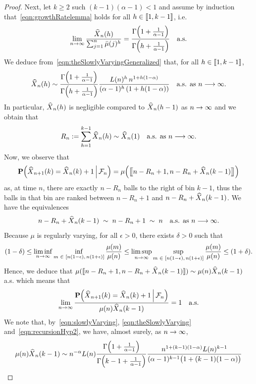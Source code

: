 \documentclass[AHL,Unicode,longabstracts,published]{cedram}
\renewcommand{\P}{\mathbf{P}}
\newcommand{\clF}{\mathcal{F}}
\let\originalleft\left
\let\originalright\right
\renewcommand{\left}{\mathopen{}\mathclose\bgroup\originalleft}
\renewcommand{\right}{\aftergroup\egroup\originalright}
\let\oldin\in
\renewcommand{\in}{\mathchoice{\oldin}{\oldin}{\,\oldin\,}{\,\oldin\,}}
\renewcommand*{\to}{\mathchoice{\longrightarrow}{\rightarrow}{\rightarrow}{\rightarrow}}
\let\oldhat\hat
\renewcommand*{\hat}[1]{\mathchoice{\widehat{#1}}{\widehat{#1}}{\oldhat{#1}}{\oldhat{#1}}}
\newcommand{\llbracket}{\mathopen{[\mkern -2.7mu[}}
\newcommand{\rrbracket}{\mathclose{]\mkern -2.7mu]}}
\newcommand{\llb}{\llbracket}
\newcommand{\rrb}{\rrbracket}
\newcommand{\llbigbracket}{\mathopen{\bigl[\mkern -4.2mu\bigl[}}
\newcommand{\rrbigbracket}{\mathclose{\bigr]\mkern -4.2mu\bigr]}}
\newcommand{\llbg}{\llbigbracket}
\newcommand{\rrbg}{\rrbigbracket}
\begin{document}
\begin{proof}
Next, let $k \geq 2$ such $(k-1)(\alpha-1) < 1$ and assume by induction that~\eqref{eqn:growthRatelemma} holds for all $h \in \llb 1, k-1\rrb $, i.e.
\begin{equation}\label{eqn:recursionHyp}
\lim_{n \to \infty} \frac{\hat{X}_n(h)}{\sum_{j=1}^n \bar{\mu}(j)^{h}} = \frac{\Gamma\left(1 + \frac{1}{\alpha - 1}\right)}{\Gamma\left(h + \frac{1}{\alpha - 1}\right)} \quad \text{a.s.}
\end{equation}
We deduce from~\eqref{eqn:theSlowlyVaryingGeneralized} that, for all $h \in \llb 1, k-1\rrb$,
\begin{equation}\label{eqn:recursionHyp2}
\hat{X}_n(h) \sim \frac{\Gamma\left(1 + \frac{1}{\alpha - 1}\right)}{\Gamma\left(h + \frac{1}{\alpha - 1}\right)} \frac{L(n)^h\, n^{1 + h(1-\alpha)}}{(\alpha-1)^h\,(1 + h(1-\alpha))} \quad \text{a.s. as $n \to \infty$}.
\end{equation}
In particular, $\hat{X}_n(h)$ is negligible compared to $\hat{X}_n(h-1)$ as $n\to\infty$ and we obtain that
\[
R_n
:= \sum_{h=1}^{k-1} \hat{X}_n(h) \sim \hat{X}_n(1) \quad \text{a.s. as $n \to \infty$}.
\]
Now, we observe that
\[
\P\left(\hat{X}_{n+1}(k) = \hat{X}_n(k) + 1\,\middle|\, \clF_n\right) = \mu\left(\llbg n - R_n+1, n - R_n + \hat{X}_n(k-1)\rrbg\right)
\]
as, at time $n$, there are exactly $n-R_n$ balls to the right of bin $k-1$, thus the balls in that bin are ranked between $n - R_n+1$ and $n - R_n + \hat{X}_n(k-1)$. We have the equivalences
\[
n - R_n + \hat{X}_{n}(k-1) \; \sim \; n - R_n + 1\; \sim \; n \quad \text{a.s. as $n \to \infty$}.
\]
Because $\mu$ is regularly varying, for all $\epsilon > 0$, there exists $\delta > 0$ such that
\[
(1 - \delta) \leq \liminf_{n \to \infty} \inf_{m \in [n(1-\epsilon),\,n(1+\epsilon)]} \frac{\mu(m)}{\mu(n)} \leq \limsup_{n \to \infty} \sup_{m \in [n(1-\epsilon),\,n(1+\epsilon)]} \frac{\mu(m)}{\mu(n)} \leq (1+\delta).
\]
Hence, we deduce that $\mu(\llb n - R_n+1, n - R_n + \hat{X}_n(k-1)\rrb) \sim \mu(n)\hat{X}_n(k-1)$ a.s. which means that
\begin{equation*}
\lim_{n \to \infty} \frac{\P\left(\hat{X}_{n+1}(k) = \hat{X}_n(k) + 1\,\middle| \,\clF_n\right)}{\mu(n)\hat{X}_n(k-1)} = 1 \quad \text{a.s.}
\end{equation*}
We note that, by~\eqref{eqn:slowlyVarying}, \eqref{eqn:theSlowlyVarying} and~\eqref{eqn:recursionHyp2}, we have, almost surely, as $n \to \infty$,
\begin{align*}
\mu(n) \hat{X}_n(k-1) &\sim n^{-\alpha} L(n) \frac{\Gamma\left(1 + \frac{1}{\alpha - 1}\right)}{\Gamma\left(k-1 + \frac{1}{\alpha - 1}\right)} \frac{n^{1 + (k-1)(1-\alpha)}L(n)^{k-1}}{(\alpha-1)^{k-1}\bigl(1 + (k-1)(1-\alpha)\bigr)} \\

\end{align*}
\end{proof}
\end{document}
